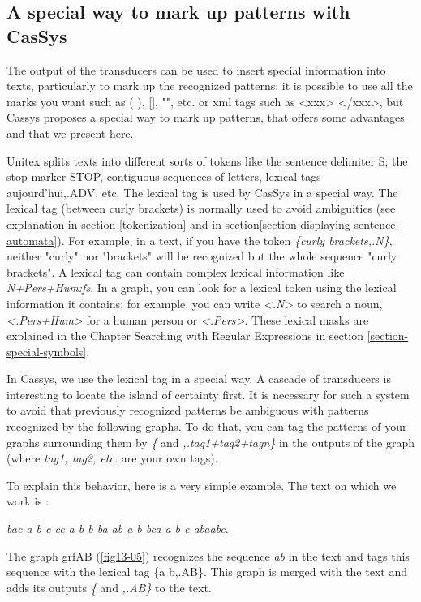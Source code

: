 \subsection{A special way to mark up patterns with CasSys}

The output of the transducers can be used to insert special information into texts, particularly to mark up the  recognized patterns: it is 
possible to use all the marks you want such as ( ), [], "", etc. or xml tags such as <xxx> </xxx>, but Cassys proposes a special way to 
mark up patterns, that offers some advantages and that we present here.  

\bigskip
\noindent Unitex splits texts into different sorts of tokens like the sentence delimiter {S}; the stop marker {STOP}, contiguous 
sequences of letters, lexical tags {aujourd'hui,.ADV}, etc. The lexical tag is used by CasSys in a special way. The lexical tag (between curly brackets) is normally used to avoid ambiguities (see explanation in section \ref{tokenization} and in section\ref{section-displaying-sentence-automata}). 
For example, in a text, if you have the token \emph{\{curly brackets,.N\}}, neither "curly" nor "brackets" will be recognized but the whole sequence 
"curly brackets". A lexical tag can contain complex lexical information like \emph{N+Pers+Hum:fs}.
In a graph, you can look for a lexical token using the lexical information it contains: for example, you can write \emph{<.N>} to search 
a noun, \emph{<.Pers+Hum>} for a human person or \emph{<.Pers>}. These lexical masks are explained in the Chapter Searching with Regular Expressions in section \ref{section-special-symbols}.
 
\bigskip
\noindent In Cassys, we use the lexical tag in a special way. A cascade of transducers is interesting to locate the island of certainty first. It is necessary for such a system to avoid that previously recognized patterns be ambiguous with patterns recognized by the following graphs. To do that, you can tag the patterns of your graphs surrounding them by \emph{\{} and \emph{,.tag1+tag2+tagn\}} in the outputs of the graph (where \emph{tag1, tag2, etc.} are your own tags).

\bigskip
\noindent To explain this behavior, here is a very simple example. The text on which we work is :

\emph{bac a b c cc a b b ba ab a b bca a b c abaabc}.

\bigskip
\noindent The graph grfAB (\ref{fig13-05}) recognizes the sequence \emph{ab} in the text and tags this sequence with the lexical tag \{a b,.AB\}. This graph is merged with the text and adds its outputs \emph{\{ }and \emph{,.AB\}} to the text. 

